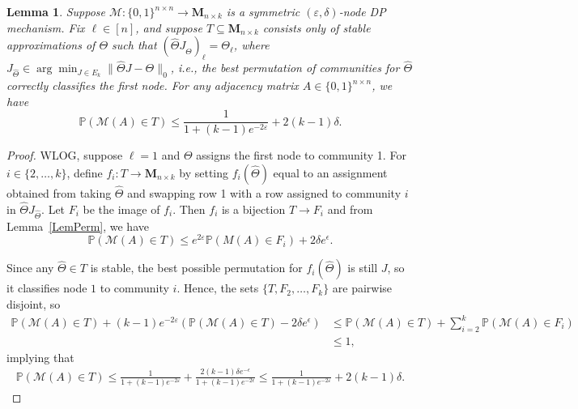 \documentclass[10pt,a4paper]{amsart}
\newtheorem{lemma}{Lemma}
\newcommand{\calM}{\mathcal{M}}
\newcommand{\eps}{\varepsilon}
\begin{document}
\begin{lemma}
\label{LemStableBound}
Suppose $\calM: \{0,1\}^{n\times n}\to \mathbf{M}_{n\times k}$ is a symmetric $(\eps, \delta)$-node DP mechanism. Fix $\ell \in [n]$, and suppose $T\subseteq \mathbf{M}_{n\times k}$ consists only of stable approximations of $\Theta$ such that $(\hat\Theta J_{\hat \Theta})_{\ell} = \Theta_\ell$, where $J_{\hat\Theta} \in \arg\min_{J \in E_k} \|\hat\Theta J - \Theta\|_0$, i.e., the best permutation of communities for $\hat\Theta$ correctly classifies the first node. For any adjacency matrix $A\in \{0,1\}^{n\times n}$, we have
$$\mathbb{P}(\calM(A)\in T) \leq \frac{1}{1+(k-1)e^{-2\eps}} + 2(k - 1)\delta.
$$
\end{lemma}

\begin{proof}
WLOG, suppose $\ell = 1$ and $\Theta$ assigns the first node to community 1. For $i\in \{2, \ldots, k\}$, define $f_i:T\to \mathbf{M}_{n\times k}$ by setting $f_i(\hat\Theta)$ equal to an assignment obtained from taking $\hat\Theta$ and swapping row 1 with a row assigned to community $i$ in $\hat\Theta J_{\hat\Theta}$. Let $F_i$ be the image of $f_i$. Then $f_i$ is a bijection $T\to F_i$ and from Lemma~\ref{LemPerm}, we have
\begin{equation*}
\mathbb{P}(\calM(A)\in T)\leq e^{2\eps} \mathbb{P}(M(A)\in F_i) + 2\delta e^{\epsilon}.
\end{equation*}

Since any $\hat\Theta\in T$ is stable, the best possible permutation for $f_i(\hat\Theta)$ is still $J$, so it classifies node $1$ to community $i$. Hence, the sets $\{T, F_2, \dots, F_k\}$ are pairwise disjoint, so
\begin{align*}
\mathbb{P}(\calM(A)\in T) + (k-1)e^{-2\eps} \left(\mathbb{P}(\calM(A)\in T) - 2\delta e^{\epsilon}\right) & \le \mathbb{P}(\calM(A)\in T) + \sum_{i=2}^k \mathbb{P}(\calM(A)\in F_i) \\
%
& \leq 1,
\end{align*}
implying that
\begin{align*}
\mathbb{P}(\calM(A)\in T) \leq \frac{1}{1+(k-1)e^{-2\eps}} + \frac{2(k - 1)\delta e^{-\epsilon}}{1 + (k - 1)e^{-2\epsilon}} \leq \frac{1}{1+(k-1)e^{-2\eps}} + 2(k - 1)\delta.
\end{align*}
\end{proof}
\end{document}

